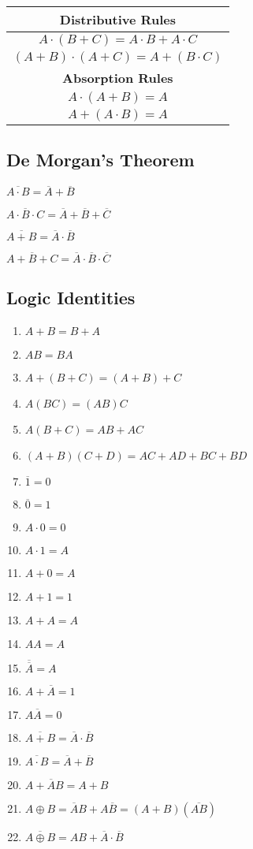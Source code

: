 \documentclass[9 pt]{article}
\begin{document}
\begin{multicols*}{4}
\begin{tabular}{|c|}
\textbf{Distributive Rules} \\
\hline
$A \cdot (B+C) = A \cdot B + A \cdot C$ \\
$(A+B) \cdot (A+C) = A + (B\cdot C)$ \\ 
\hline
\textbf{Absorption Rules} \\
\hline
$A \cdot (A+B) = A$\\
$A+(A \cdot B) = A$\\
\hline
\end{tabular}

\subsection*{De Morgan's Theorem}
$\overline{A\cdot B} = \overline{A} + \overline{B}$ \par
$\overline{A \cdot B \cdot C} = \overline{A} + \overline{B} + \overline{C}$ \par
$\overline{A+B} = \overline{A} \cdot \overline{B}$\par
$\overline{A+B+C} = \overline{A} \cdot \overline{B} \cdot \overline{C}$

\vspace{1cm}
\subsection*{Logic Identities}
\begin{enumerate}
	\itemsep0em
	\item $A+B=B+A$
	\item $AB=BA$
	\item $A+(B+C)=(A+B)+C$
	\item $A(BC)=(AB)C$
	\item $A(B+C)=AB+AC$
	\item $(A+B)(C+D)=AC+AD+BC+BD$
	\item $\overline{1}=0$
	\item $\overline{0}=1$
	\item $A\cdot 0 = 0$
	\item $A \cdot 1 = A$
	\item $ A+0=A$
	\item $A+1=1$
	\item $A+A=A$
	\item $AA=A$
	\item $\overline{\overline{A}}=A$
	\item $A+\overline{A} =1$
	\item $A\overline{A}=0$
	\item $\overline{A+B}=\overline{A}\cdot \overline{B}$
	\item $\overline{A\cdot B}=\overline{A}+\overline{B}$
	\item $A+\overline{A}B=A+B$
	\item $A \oplus B = \overline{A}B+A\overline{B} = (A+B)(\overline{AB})$
	\item $\overline{A\oplus B}=AB+\overline{A}\cdot \overline{B}$
\end{enumerate}


\end{multicols*}
\end{document}
